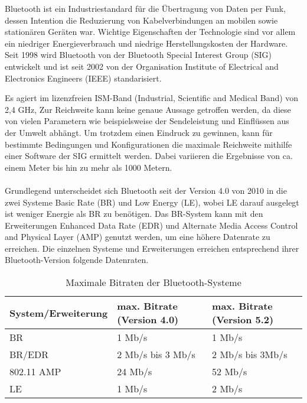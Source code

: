 Bluetooth ist ein Industriestandard für die Übertragung von Daten per Funk, dessen Intention die Reduzierung von Kabelverbindungen an mobilen sowie stationären Geräten war. Wichtige Eigenschaften der Technologie sind vor allem ein niedriger Energieverbrauch und niedrige Herstellungskosten der Hardware. Seit 1998 wird Bluetooth von der Bluetooth Special Interest Group (SIG) entwickelt und ist seit 2002 von der Organisation Institute of Electrical and Electronics Engineers (IEEE) standarisiert.

Es agiert im lizenzfreien ISM-Band (Industrial, Scientific and Medical Band) von 2,4 GHz, 
Zur Reichweite kann keine genaue Aussage getroffen werden, da diese von vielen Parametern wie beispielsweise der Sendeleistung und Einflüssen aus der Umwelt abhängt. Um trotzdem einen Eindruck zu gewinnen, kann für bestimmte Bedingungen und Konfigurationen die maximale Reichweite mithilfe einer Software der SIG ermittelt werden. Dabei variieren die Ergebnisse von ca. einem Meter bis hin zu mehr als 1000 Metern.
\\\\
Grundlegend unterscheidet sich Bluetooth seit der Version 4.0 von 2010 in die zwei Systeme Basic Rate (BR) und Low Energy (LE), wobei LE darauf ausgelegt ist weniger Energie als BR zu benötigen. Das BR-System kann mit den Erweiterungen Enhanced Data Rate (EDR) und Alternate Media Access Control and Physical Layer (AMP) genutzt werden, um eine höhere Datenrate zu erreichen. Die einzelnen Systeme und Erweiterungen erreichen entsprechend ihrer Bluetooth-Version folgende Datenraten.\\

\begin{table}
    \caption{Maximale Bitraten der Bluetooth-Systeme}
    \begin{tabular}[h]{l|l|l}
    System/Erweiterung & max. Bitrate (Version 4.0) & max. Bitrate (Version 5.2) \\
    \hline
    BR & 1 Mb/s & 1 Mb/s \\
    BR/EDR & 2 Mb/s bis 3 Mb/s & 2 Mb/s bis 3Mb/s \\
    802.11 AMP & 24 Mb/s & 52 Mb/s \\
    LE & 1 Mb/s & 2 Mb/s \\
    \end{tabular}
\end{table}


